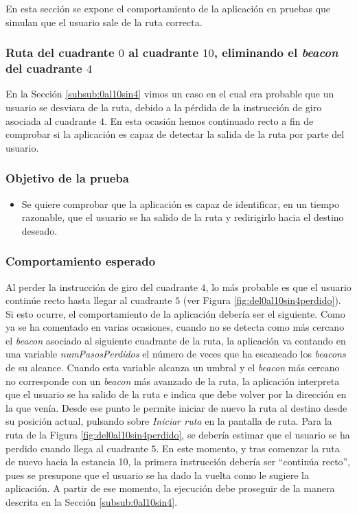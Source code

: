 En esta sección se expone el comportamiento de la aplicación en pruebas que simulan que el usuario sale de la ruta correcta.

\subsubsection{Ruta del cuadrante $0$ al cuadrante $10$, eliminando el \textit{beacon} del cuadrante $4$}

En la Sección \ref{subsub:0al10sin4} vimos un caso en el cual era probable que un usuario se desviara de la ruta, debido a la pérdida de la instrucción de giro asociada al cuadrante $4$. En esta ocasión hemos continuado recto a fin de comprobar si la aplicación es capaz de detectar la salida de la ruta por parte del usuario. 

\subsubsection*{Objetivo de la prueba}

\begin{itemize}
	\item Se quiere comprobar que la aplicación es capaz de identificar, en un tiempo razonable, que el usuario se ha salido de la ruta y redirigirlo hacia el destino deseado.
\end{itemize}


\subsubsection*{Comportamiento esperado}

Al perder la instrucción de giro del cuadrante $4$, lo más probable es que el usuario continúe recto hasta llegar al cuadrante $5$ (ver Figura \ref{fig:del0al10sin4perdido}). Si esto ocurre, el comportamiento de la aplicación debería ser el siguiente. Como ya se ha comentado en varias ocasiones, cuando no se detecta como más cercano el \textit{beacon} asociado al siguiente cuadrante de la ruta, la aplicación va contando en una variable \textit{numPasosPerdidos} el número de veces que ha escaneado los \textit{beacons} de su alcance. Cuando esta variable alcanza un umbral y el \textit{beacon} más cercano no corresponde con un \textit{beacon} más avanzado de la ruta, la aplicación interpreta que el usuario se ha salido de la ruta e indica que debe volver por la dirección en la que venía. Desde ese punto le permite iniciar de nuevo la ruta al destino desde su posición actual, pulsando sobre \textit{Iniciar ruta} en la pantalla de ruta. Para la ruta de la Figura \ref{fig:del0al10sin4perdido}, se debería estimar que el usuario se ha perdido cuando llega al cuadrante $5$. En este momento, y tras comenzar la ruta de nuevo hacia la estancia 10, la primera instrucción debería ser ``continúa recto'', pues se presupone que el usuario se ha dado la vuelta como le sugiere la aplicación. A partir de ese momento, la ejecución debe proseguir de la manera descrita en la Sección \ref{subsub:0al10sin4}.

